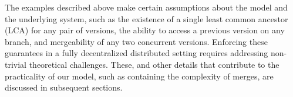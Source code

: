 The examples described above make certain assumptions about the model
and the underlying system, such as the existence of a single least
common ancestor (LCA) for any pair of versions, the ability to access
a previous version on any branch, and mergeability of any two
concurrent versions. Enforcing these guarantees in a fully
decentralized distributed setting requires addressing non-trivial
theoretical challenges. These, and other details that contribute to
the practicality of our model, such as containing the complexity of
merges, are discussed in subsequent sections.


